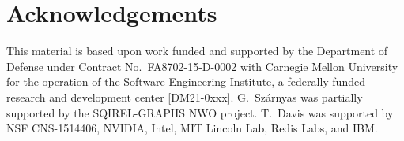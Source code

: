 \section*{Acknowledgements}

This material is based upon work funded and supported by the Department of
Defense under Contract No.~FA8702-15-D-0002 with Carnegie Mellon University for
the operation of the Software Engineering Institute, a federally funded research
and development center [DM21-0xxx].
G.~Sz\'arnyas was partially supported by the SQIREL-GRAPHS NWO project.
T.~Davis was supported by
NSF CNS-1514406, NVIDIA, Intel, MIT Lincoln Lab,
Redis Labs, and IBM.


